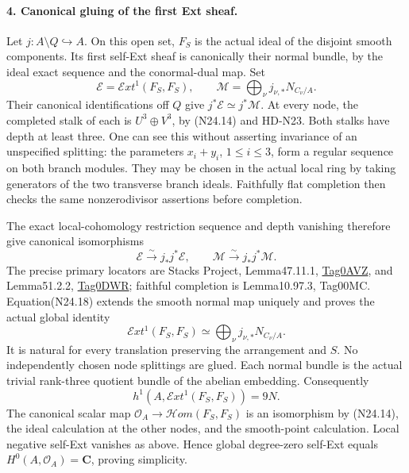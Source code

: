 \paragraph{4. Canonical gluing of the first Ext sheaf.}
Let $j:A\setminus Q\hookrightarrow A$. On this open set,
$F_S$ is the actual ideal of the disjoint smooth components.
Its first self-Ext sheaf is canonically their normal bundle,
by the ideal exact sequence and the conormal-dual map. Set
\[
 \mathcal E=\mathcal E xt^1(F_S,F_S),\qquad
                   \mathcal M=\bigoplus_\nu j_{\nu,*}N_{C_\nu/A}.
                                                               \tag{N24.17}
\]
Their canonical identifications off $Q$ give
$j^*\mathcal E\simeq j^*\mathcal M$. At every node, the
completed stalk of each is $U^3\oplus V^3$, by (N24.14)
and HD-N23. Both stalks have depth at least three. One can
see this without asserting invariance of an unspecified
splitting: the parameters $x_i+y_i$, $1\le i\le3$, form
a regular sequence on both branch modules. They may be
chosen in the actual local ring by taking generators of the
two transverse branch ideals. Faithfully flat completion
then checks the same nonzerodivisor assertions before
completion.

The exact local-cohomology restriction sequence and depth
vanishing therefore give canonical isomorphisms
\[
 \mathcal E\xrightarrow{\sim}j_*j^*\mathcal E,
 \qquad\mathcal M\xrightarrow{\sim}j_*j^*\mathcal M.       \tag{N24.18}
\]
The precise primary locators are Stacks Project,
Lemma47.11.1, \href{https://stacks.math.columbia.edu/tag/0AVZ}{Tag0AVZ},
and Lemma51.2.2,
\href{https://stacks.math.columbia.edu/tag/0DWR}{Tag0DWR};
faithful completion is Lemma10.97.3, Tag00MC.
Equation(N24.18) extends the smooth normal map uniquely and
proves the actual global identity
\[
 \mathcal E xt^1(F_S,F_S)\simeq
                    \bigoplus_\nu j_{\nu,*}N_{C_\nu/A}.
                                                               \tag{N24.19}
\]
It is natural for every translation preserving the arrangement
and $S$. No independently chosen node splittings are glued.
Each normal bundle is the actual trivial rank-three quotient
bundle of the abelian embedding. Consequently
\[
             h^1(A,\mathcal E xt^1(F_S,F_S))=9N.            \tag{N24.20}
\]
The canonical scalar map
$\mathcal O_A\to\mathcal H om(F_S,F_S)$ is an isomorphism
by (N24.14), the ideal calculation at the other nodes, and
the smooth-point calculation. Local negative self-Ext vanishes
as above. Hence global degree-zero self-Ext equals
$H^0(A,\mathcal O_A)=\mathbf C$, proving simplicity.

